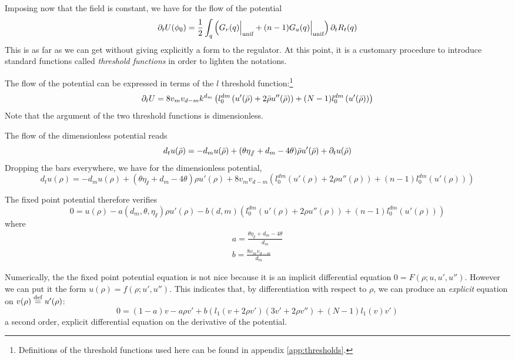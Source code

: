 Imposing now that the field is constant, we have for the flow of the potential
\begin{equation}
\partial_{t} U(\phi_0) = \frac{1}{2} \int_q \left( G_r(q) \Big|_{\text{unif}}  + (n-1)G_a(q) \Big|_{\text{unif}}  \right) \partial_{t} R_t(q)
\end{equation}
This is as far as we can get without giving explicitly a form to the regulator. 
At this point, it is a customary procedure to introduce standard functions called \textit{threshold functions} in order to lighten the notations.

The flow of the potential can be expressed in terms of the $l$ threshold function:\footnote{Definitions of the threshold functions used here can be found in appendix \ref{app:thresholds}.}
\begin{equation}
\partial_{t}U = 8 v_m v_{d-m} k^{d_m} \left( l_0^{dm}\left(u'(\bar{\rho}) + 2 \bar{\rho} u''(\bar{\rho}) \right) + (N-1)l_0^{dm}\left(u'(\bar{\rho})\right) \right)
\end{equation}
Note that the argument of the two threshold functions is dimensionless.

The flow of the dimensionless potential reads
\begin{equation}
d_t u(\bar{\rho}) = -d_m u(\bar{\rho}) +(\theta \eta_\sslash + d_m - 4 \theta) \bar{\rho} u'(\bar{\rho}) + \partial_{t} u(\bar{\rho})
\end{equation}
Dropping the bars everywhere, we have for the dimensionless potential,
\begin{equation}
\label{eq:flow_u}
d_t u(\rho) = -d_m u(\rho) +(\theta \eta_\sslash + d_m - 4 \theta) \rho u'(\rho) + 8 v_m v_{d-m} \left( l_0^{dm}\left(u'(\rho) + 2 \rho u''(\rho) \right) + (n-1)l_0^{dm}\left(u'(\rho)\right) \right)
\end{equation}

The fixed point potential therefore verifies
\begin{equation}
0 = u(\rho) - a(d_m, \theta, \eta_\sslash) \rho u'(\rho) - b(d, m) 
\left( l_0^{dm}\left( u'(\rho) + 2 \rho u''(\rho) \right) + (n-1)l_0^{dm}\left( u'(\rho) \right) \right) 
\end{equation}
where 
\begin{align}
a = \frac{\theta \eta_\sslash + d_m - 4 \theta}{d_m} \\
b = \frac{8 v_m v_{d-m}}{d_m}
\end{align}

Numerically, the the fixed point potential equation is not nice because it is an implicit differential equation
$0 = F(\rho ; u, u', u'')$.
However we can put it the form
$u(\rho) = f(\rho; u', u'')$.
This indicates that, by differentiation with respect to $\rho$, we can produce an \textit{explicit} equation on $v(\rho)  \overset{\text{def}}{=}  u'(\rho)$:
\begin{equation}
0 = (1-a) v - a \rho v' + b \left( l_1\left(v+2\rho v'\right)\left(3v'+2\rho v''\right) + (N-1)l_1\left(v\right)v' \right)
\end{equation}
a second order, explicit differential equation on the derivative of the potential.


